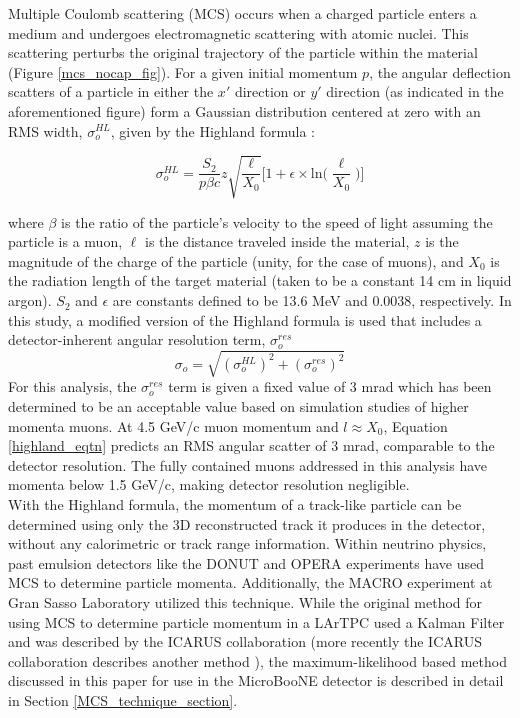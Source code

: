 \documentclass[a4paper,11pt]{article}
\begin{document}
Multiple Coulomb scattering (MCS) occurs when a charged particle enters a medium and undergoes electromagnetic scattering with atomic nuclei. This scattering perturbs the original trajectory of the particle within the material (Figure \ref{mcs_nocap_fig}). For a given initial momentum $p$, the angular deflection scatters of a particle in either the $x'$ direction or $y'$ direction (as indicated in the aforementioned figure) form a Gaussian distribution centered at zero with an RMS width, $\sigma_o^{HL}$, given by the Highland formula \cite{highland}: 

\begin{equation}\label{highland_eqtn}
	\sigma_o^{HL}=\frac{S_2}{p\beta c}z\sqrt{\frac{\ell}{X_0}}\Big[1+\epsilon\times\text{ln}\Big(\frac{\ell}{X_0}\Big)\Big]
\end{equation}

\noindent where $\beta$ is the ratio of the particle's velocity to the speed of light assuming the particle is a muon, $\ell$ is the distance traveled inside the material, $z$ is the magnitude of the charge of the particle (unity, for the case of muons), and $X_0$ is the radiation length of the target material (taken to be a constant 14 cm in liquid argon). $S_2$ and $\epsilon$ are constants defined to be 13.6 MeV and 0.0038, respectively. In this study, a modified version of the Highland formula is used that includes a detector-inherent angular resolution term, $\sigma_o^{res}$
\begin{equation}\label{modified_highland_eqtn}
\sigma_{o} = \sqrt{ (\sigma_o^{HL})^2 + (\sigma_o^{res})^2}%
\end{equation}
For this analysis, the $\sigma_o^{res}$ term is given a fixed value of 3 mrad which has been determined to be an acceptable value based on simulation studies of higher momenta muons. At 4.5 GeV/c muon momentum and $l\approx X_0$, Equation \ref{highland_eqtn} predicts an RMS angular scatter of 3 mrad, comparable to the detector resolution. The fully contained muons addressed in this analysis have momenta below 1.5 GeV/c, making detector resolution negligible.\\

With the Highland formula, the momentum of a track-like particle can be determined using only the 3D reconstructed track it produces in the detector, without any calorimetric or track range information. Within neutrino physics, past emulsion detectors like the DONUT \cite{DONUT_paper} and OPERA \cite{OPERA_paper} experiments have used MCS to determine particle momenta. Additionally, the MACRO \cite{MACRO_paper} experiment at Gran Sasso Laboratory utilized this technique. While the original method for using MCS to determine particle momentum in a LArTPC used a Kalman Filter and was described by the ICARUS collaboration \cite{icarus_mcs_paper} (more recently the ICARUS collaboration describes another method \cite{new_icarus_paper}), the maximum-likelihood based method discussed in this paper for use in the MicroBooNE detector is described in detail in Section \ref{MCS_technique_section}.
\end{document}

